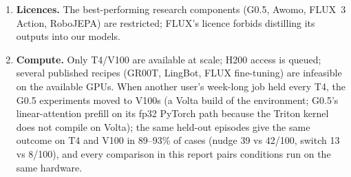 \documentclass[10pt,a4paper]{article}
\begin{document}
\begin{enumerate}
\item \textbf{Licences.} The best-performing research components (G0.5, Awomo, FLUX~3 Action, RoboJEPA) are restricted; FLUX's licence forbids distilling its outputs into our models.
\item \textbf{Compute.} Only T4/V100 are available at scale; H200 access is queued; several published recipes (GR00T, LingBot, FLUX fine-tuning) are infeasible on the available GPUs. When another user's week-long job held every T4, the G0.5 experiments moved to V100s (a Volta build of the environment; G0.5's linear-attention prefill on its fp32 PyTorch path because the Triton kernel does not compile on Volta); the same held-out episodes give the same outcome on T4 and V100 in 89--93\% of cases (nudge 39 vs 42/100, switch 13 vs 8/100), and every comparison in this report pairs conditions run on the same hardware.
\end{enumerate}

\end{document}
